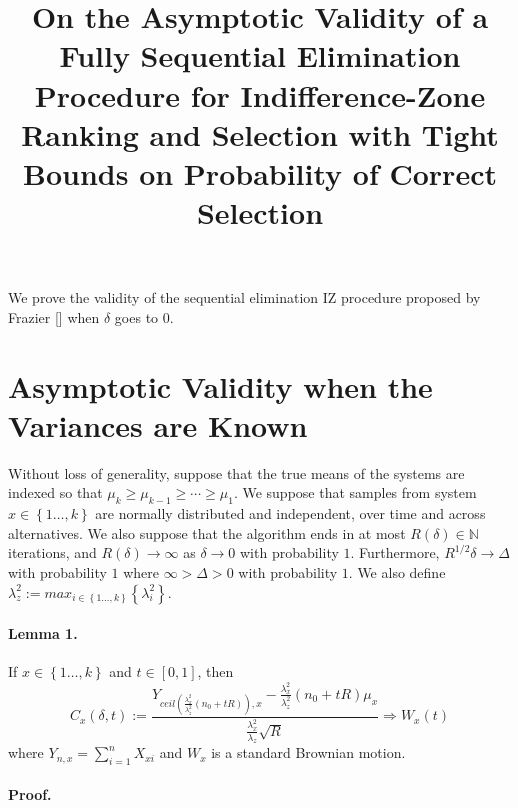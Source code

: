 \documentclass[12pt,english]{article}
\begin{document}
\title{On the Asymptotic Validity of a Fully Sequential Elimination Procedure
for Indifference-Zone Ranking and Selection with Tight Bounds on Probability
of Correct Selection}

\maketitle
We prove the validity of the sequential elimination IZ procedure proposed
by Frazier {[}{]} when $\delta$ goes to $0$.


\section*{Asymptotic Validity when the Variances are Known}

Without loss of generality, suppose that the true means of the systems
are indexed so that $\mu_{k}\geq\mu_{k-1}\geq\cdots\geq\mu_{1}$.
We suppose that samples from system $x\in\left\{ 1\ldots,k\right\} $
are normally distributed and independent, over time and across alternatives.
We also suppose that the algorithm ends in at most $R\left(\delta\right)\in\mathbb{N}$
iterations, and $R(\delta)\rightarrow\infty$ as $\delta\rightarrow0$
with probability $1$. Furthermore, $R^{1/2}\delta\rightarrow\Delta$
with probability $1$ where $\infty>\Delta>0$ with probability $1$.
We also define $\lambda_{z}^{2}:=max_{i\in\left\{ 1\ldots,k\right\} }\left\{ \lambda_{i}^{2}\right\} $. 


\paragraph*{Lemma 1.}

If $x\in\left\{ 1\ldots,k\right\} $ and $t\in\left[0,1\right]$,
then
\[
C_{x}\left(\delta,t\right):=\frac{Y_{ceil\left(\frac{\lambda_{x}^{2}}{\lambda_{z}^{2}}\left(n_{0}+tR\right)\right),x}-\frac{\lambda_{x}^{2}}{\lambda_{z}^{2}}\left(n_{0}+tR\right)\mu_{x}}{\frac{\lambda_{x}^{2}}{\lambda_{z}}\sqrt{R}}\Rightarrow W_{x}\left(t\right)
\]
where $Y_{n,x}=\sum_{i=1}^{n}X_{xi}$ and $W_{x}$ is a standard Brownian
motion.


\paragraph*{Proof.}
\end{document}
